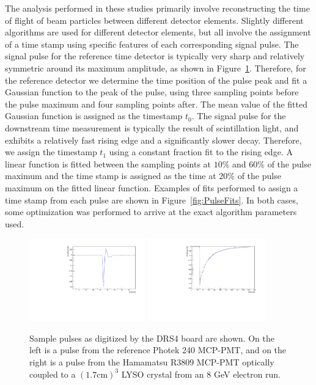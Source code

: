 \documentclass[12pt]{article}
\begin{document}
The analysis performed in these studies primarily involve
reconstructing the time of flight of beam particles
between different detector elements. Slightly different
algorithms are used for different detector elements,
but all involve the assignment of a time stamp using 
specific features of each corresponding signal pulse.
The signal pulse for the reference time detector
is typically very sharp and relatively symmetric 
around its maximum amplitude, as shown in 
Figure~\ref{fig:PulseShapes}. Therefore, for the reference 
detector we determine the time position of the pulse
peak and fit a Gaussian function to the peak
of the pulse, using three sampling points before the 
pulse maximum and four sampling points after. The
mean value of the fitted Gaussian function is
assigned as the timestamp $t_{0}$. The signal pulse
for the downstream time measurement is typically
the result of scintillation light, and exhibits a 
relatively fast rising edge and a significantly slower
decay. Therefore, we assign the timestamp $t_{1}$ 
using a constant fraction fit to the rising edge.
A linear function is fitted between the sampling
points at $10\%$ and $60\%$ of the pulse maximum
and the time stamp is assigned as the time 
at $20\%$ of the pulse maximum on the fitted
linear function. Examples of fits performed to assign a 
time stamp from each pulse are shown in Figure~\ref{fig:PulseFits}.
In both cases, some optimization was performed 
to arrive at the exact algorithm parameters used.

\begin{figure}[h] \centering
\includegraphics[width=0.45\textwidth]{figs/RefPulse} 
\includegraphics[width=0.45\textwidth]{figs/ScintPulse} 
\caption{Sample pulses as digitized by the DRS4 board are shown. 
On the left is a  pulse from the reference Photek 240 MCP-PMT, 
and on the right is a pulse from the Hamamatsu R3809 MCP-PMT
optically coupled to a $(1.7\mathrm{ cm})^3$ LYSO crystal 
from an 8 GeV electron run.} 
\label{fig:PulseShapes}
\end{figure}
\end{document}
